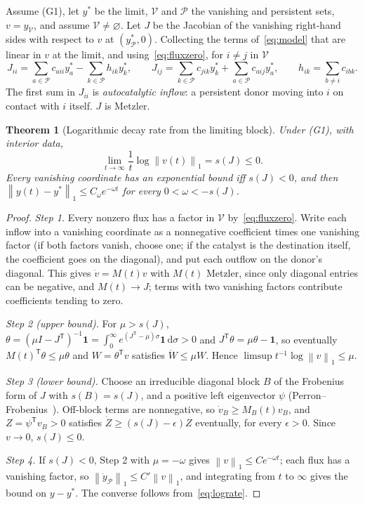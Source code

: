 \documentclass[11pt,a4paper]{article}
\newtheorem{theorem}{Theorem}[section]
\theoremstyle{definition}\newtheorem{definition}[theorem]{Definition}
\theoremstyle{remark}\newtheorem{remark}[theorem]{Remark}
\newcommand{\dd}{\,\mathrm d}
\newcommand{\one}{\mathbf 1}
\newcommand{\Vs}{\mathcal V}
\newcommand{\Ps}{\mathcal P}
\newcommand{\norm}[1]{\left\lVert#1\right\rVert}
\begin{document}
Assume (G1), let $y^*$ be the limit, $\Vs$ and $\Ps$ the vanishing and
persistent sets, $v=y_\Vs$, and assume $\Vs\ne\varnothing$. Let $J$ be
the Jacobian of the vanishing right-hand sides with respect to $v$ at
$(y_\Ps^*,0)$. Collecting the terms of~\eqref{eq:model} that are linear
in $v$ at the limit, and using~\eqref{eq:fluxzero}, for $i\ne j$ in $\Vs$
\begin{equation}
J_{ii}=\sum_{a\in\Ps}c_{aii}y_a^*-\sum_{k\in\Ps}h_{ik}y_k^*,\qquad
J_{ij}=\sum_{k\in\Ps}c_{jik}y_k^*+\sum_{a\in\Ps}c_{aij}y_a^*,\qquad
h_{ik}=\sum_{b\ne i}c_{ibk}.
\label{eq:Jentries}
\end{equation}
The first sum in $J_{ii}$ is \emph{autocatalytic inflow}: a persistent
donor moving into $i$ on contact with $i$ itself. $J$ is Metzler.

\begin{theorem}[Logarithmic decay rate from the limiting block]
\label{thm:spectral}
Under (G1), with interior data,
\begin{equation}
\lim_{t\to\infty}\frac1t\log\norm{v(t)}_1=s(J)\le0 .
\label{eq:lograte}
\end{equation}
Every vanishing coordinate has an exponential bound iff $s(J)<0$, and
then $\norm{y(t)-y^*}_1\le C_\omega e^{-\omega t}$ for every
$0<\omega<-s(J)$.
\end{theorem}
\begin{proof}
\emph{Step 1.} Every nonzero flux has a factor in $\Vs$
by~\eqref{eq:fluxzero}. Write each inflow into a vanishing coordinate as
a nonnegative coefficient times one vanishing factor (if both factors
vanish, choose one; if the catalyst is the destination itself, the
coefficient goes on the diagonal), and put each outflow on the donor's
diagonal. This gives $\dot v=M(t)v$ with $M(t)$ Metzler, since only
diagonal entries can be negative, and $M(t)\to J$; terms with two
vanishing factors contribute coefficients tending to zero.

\emph{Step 2 (upper bound).} For $\mu>s(J)$,
$\theta=(\mu I-J^{\mathsf T})^{-1}\one=\int_0^\infty e^{(J^{\mathsf T}-\mu)\sigma}\one\dd\sigma>0$
and $J^{\mathsf T}\theta=\mu\theta-\one$, so eventually
$M(t)^{\mathsf T}\theta\le\mu\theta$ and $W=\theta^{\mathsf T}v$ satisfies
$\dot W\le\mu W$. Hence $\limsup t^{-1}\log\norm v_1\le\mu$.

\emph{Step 3 (lower bound).} Choose an irreducible diagonal block $B$ of
the Frobenius form of $J$ with $s(B)=s(J)$, and a positive left
eigenvector $\psi$ (Perron--Frobenius~\cite{BermanPlemmons}). Off-block
terms are nonnegative, so $\dot v_B\ge M_B(t)v_B$, and $Z=\psi^{\mathsf T}v_B>0$
satisfies $\dot Z\ge(s(J)-\epsilon)Z$ eventually, for every $\epsilon>0$.
Since $v\to0$, $s(J)\le0$.

\emph{Step 4.} If $s(J)<0$, Step 2 with $\mu=-\omega$ gives
$\norm v_1\le Ce^{-\omega t}$; each flux has a vanishing factor, so
$\norm{\dot y_\Ps}_1\le C'\norm v_1$, and integrating from $t$ to
$\infty$ gives the bound on $y-y^*$. The converse follows
from~\eqref{eq:lograte}.
\end{proof}
\end{document}
